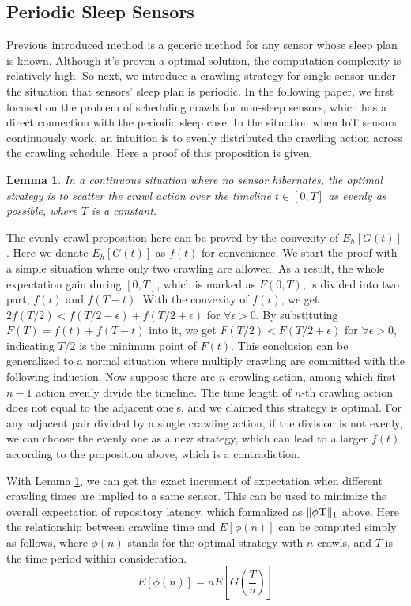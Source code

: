 \documentclass[conference]{IEEEtran}
\newtheorem{lemma}{Lemma}
\begin{document}
\subsection{Periodic Sleep Sensors}

Previous introduced method is a generic method for any sensor whose sleep plan is known. Although it's proven a optimal solution, the computation complexity is relatively high.
So next, we introduce a crawling strategy for single sensor under the situation that sensors' sleep plan is periodic.
In the following paper, we first focused on the problem of scheduling crawls for non-sleep sensors, which has a direct connection with the periodic sleep case.
In the situation when IoT sensors continuously work, an intuition is to evenly distributed the crawling action across the crawling schedule. Here a proof of this proposition is given.

\begin{lemma}
\label{evenly}
In a continuous situation where no sensor hibernates, the optimal strategy is to scatter the crawl action over the timeline $t\in [0, T]$ as evenly as possible, where $T$ is a constant.
\end{lemma}
\begin{IEEEproof}
The evenly crawl proposition here can be proved by the convexity of $E_h[G(t)]$ \cite{boyd2004convex}. Here we donate $E_h[G(t)]$ as $f(t)$ for convenience. 
We start the proof with a simple situation where only two crawling are allowed. 
As a result, the whole expectation gain during $[0,T]$, which is marked as $F(0, T)$, is divided into two part, $f(t)$ and $f(T-t)$. With the convexity of $f(t)$, we get $2f(T/2)<f(T/2-\epsilon)+f(T/2+\epsilon)$ for $\forall{\epsilon>0}$. By substituting $F(T)=f(t)+f(T-t)$ into it, we get $F(T/2)<F(T/2+\epsilon)$ for $\forall{\epsilon>0}$, indicating $T/2$ is the minimum point of $F(t)$.
This conclusion can be generalized to a normal situation where multiply crawling are committed with the following induction. 
Now suppose there are $n$ crawling action, among which first $n-1$ action evenly divide the timeline. The time length of $n$-th crawling action does not equal to the adjacent one's, and we claimed this strategy is optimal. For any adjacent pair divided by a single crawling action, if the division is not evenly, we can choose the evenly one as a new strategy, which can lead to a larger $f(t)$ according to the proposition above, which is a contradiction.
\end{IEEEproof}


With Lemma \ref{evenly}, we can get the exact increment of expectation when different crawling times are implied to a same sensor. This can be used to minimize the overall expectation of repository latency, which formalized as $\Arrowvert \phi\mathbf{T} \Arrowvert_{1}$ above.
Here the relationship between crawling time and $E[\phi(n)]$ can be computed simply as follows, where $\phi(n)$ stands for the optimal strategy with $n$ crawls, and $T$ is the time period within consideration. 
\begin{equation}
E[\phi(n)]=nE[G(\frac{T}{n})]\label{NonHib}
\end{equation}
\end{document}
